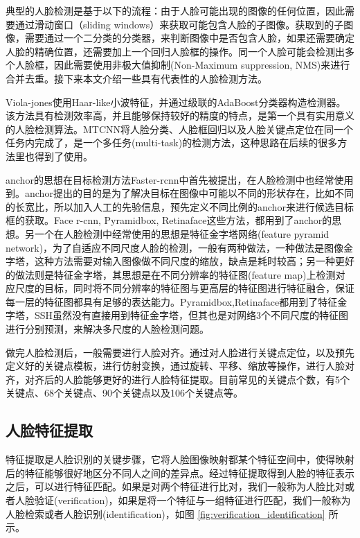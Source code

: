 典型的人脸检测是基于以下的流程：由于人脸可能出现的图像的任何位置，因此需要通过滑动窗口（sliding windows）来获取可能包含人脸的子图像。获取到的子图像，需要通过一个二分类的分类器，来判断图像中是否包含人脸，如果还需要确定人脸的精确位置，还需要加上一个回归人脸框的操作。同一个人脸可能会检测出多个人脸框，因此需要使用非极大值抑制(Non-Maximum suppression, NMS)来进行合并去重。接下来本文介绍一些具有代表性的人脸检测方法。

Viola-jones\cite{viola2001rapid}使用Haar-like小波特征，并通过级联的AdaBoost分类器构造检测器。该方法具有检测效率高，并且能够保持较好的精度的特点，是第一个具有实用意义的人脸检测算法。MTCNN\cite{zhang2016joint}将人脸分类、人脸框回归以及人脸关键点定位在同一个任务内完成了，是一个多任务(multi-task)的检测方法，这种思路在后续的很多方法里也得到了使用。

anchor的思想在目标检测方法Faster-rcnn\cite{ren2015faster}中首先被提出，在人脸检测中也经常使用到。anchor提出的目的是为了解决目标在图像中可能以不同的形状存在，比如不同的长宽比，所以加入人工的先验信息，预先定义不同比例的anchor来进行候选目标框的获取。Face r-cnn\cite{wang2017face}, Pyramidbox\cite{tang2018pyramidbox}, Retinaface\cite{deng2019retinaface}这些方法，都用到了anchor的思想。另一个在人脸检测中经常使用的思想是特征金字塔网络(feature pyramid network)，为了自适应不同尺度人脸的检测，一般有两种做法，一种做法是图像金字塔，这种方法需要对输入图像做不同尺度的缩放，缺点是耗时较高；另一种更好的做法则是特征金字塔，其思想是在不同分辨率的特征图(feature map)上检测对应尺度的目标，同时将不同分辨率的特征图与更高层的特征图进行特征融合，保证每一层的特征图都具有足够的表达能力。Pyramidbox,Retinaface都用到了特征金字塔，SSH\cite{najibi2017ssh}虽然没有直接用到特征金字塔，但其也是对网络3个不同尺度的特征图进行分别预测，来解决多尺度的人脸检测问题。

做完人脸检测后，一般需要进行人脸对齐。通过对人脸进行关键点定位，以及预先定义好的关键点模板，进行仿射变换，通过旋转、平移、缩放等操作，进行人脸对齐，对齐后的人脸能够更好的进行人脸特征提取。目前常见的关键点个数，有5个关键点、68个关键点、90个关键点以及106个关键点等。

\subsection{人脸特征提取}
特征提取是人脸识别的关键步骤，它将人脸图像映射都某个特征空间中，使得映射后的特征能够很好地区分不同人之间的差异点。经过特征提取得到人脸的特征表示之后，可以进行特征匹配。如果是对两个特征进行比对，我们一般称为人脸比对或者人脸验证(verification)，如果是将一个特征与一组特征进行匹配，我们一般称为人脸检索或者人脸识别(identification)，如图 \ref{fig:verification_identification} 所示。

